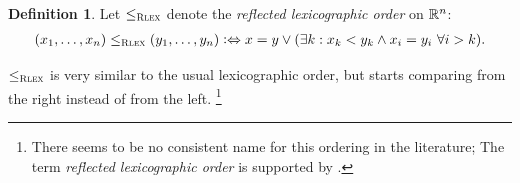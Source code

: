 \documentclass[a4paper]{scrreprt}
\theoremstyle{definition}
\newtheorem{defn}[thm]{Definition} %
\begin{document}
%        

    \begin{defn}
        Let $\leq_{\textsc{Rlex}}$ denote the \emph{reflected lexicographic order} on $\mathbb{R}^n$:
        \begin{gather*}
            (x_1, \dots, x_n) \leq_{\textsc{Rlex}} (y_1, \dots, y_n) \mathrel{\vcentcolon\Leftrightarrow} x = y \vee (\exists k: x_k < y_k \wedge x_i = y_i ~\forall i > k).
        \end{gather*}
    \end{defn}
    $\leq_{\textsc{Rlex}}$ is very similar to the usual lexicographic order, but starts comparing from the right instead of from the left. \footnote{There seems to be no consistent name for this ordering in the literature; The term \emph{reflected lexicographic order} is supported by \cite{bib:oeisRefLexOrder}.}
    
\end{document}
